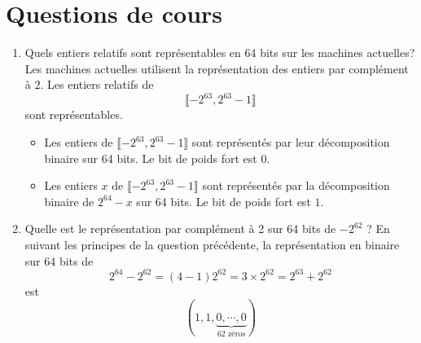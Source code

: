 

\section{Questions de cours}
\begin{enumerate}
  \item Quels entiers relatifs sont représentables en 64 bits sur les machines actuelles?\newline
Les machines actuelles utilisent la représentation des entiers par complément à $2$. Les entiers relatifs de
\begin{displaymath} 
  \llbracket -2^{63} , 2^{63} -1 \rrbracket
\end{displaymath}
sont représentables.
\begin{itemize}
  \item Les entiers de $\llbracket -2^{63} , 2^{63} -1 \rrbracket$ sont représentés par leur décomposition binaire sur 64 bits. Le bit de poids fort est $0$.
  \item Les entiers $x$ de $\llbracket -2^{63} , 2^{63} -1 \rrbracket$ sont représentés par la décomposition binaire de $2^{64} -x$ sur 64 bits. Le bit de poids fort est $1$.
\end{itemize}

  \item Quelle est le représentation par complément à 2 sur 64 bits de $-2^{62}$ ?\newline
En suivant les principes de la question précédente, la représentation en binaire sur 64 bits de 
\begin{displaymath}
2^{64}-2^{62} = (4-1)2^{62} = 3\times 2^{62} = 2^{63} + 2^{62} 
\end{displaymath}
est
\begin{displaymath}
  (1, 1, \underset{62 \text{ zéros}}{\underbrace{0, \cdots,0}})
\end{displaymath}


\end{enumerate}
